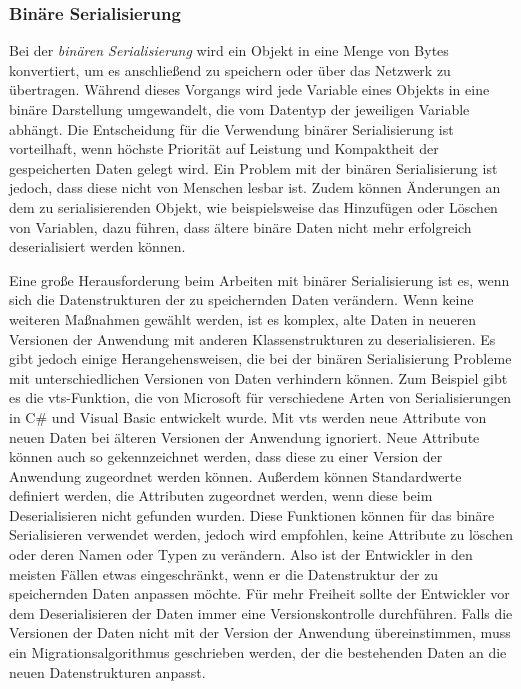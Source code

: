 \subsubsection{Binäre Serialisierung} \label{sssec:binSerialisierung}
Bei der \textit{binären Serialisierung} wird ein Objekt in eine Menge von Bytes konvertiert, um es anschließend zu speichern oder über das Netzwerk zu übertragen. Während dieses Vorgangs wird jede Variable eines Objekts in eine binäre Darstellung umgewandelt, die vom Datentyp der jeweiligen Variable abhängt. Die Entscheidung für die Verwendung binärer Serialisierung ist vorteilhaft, wenn höchste Priorität auf Leistung und Kompaktheit der gespeicherten Daten gelegt wird. Ein Problem mit der binären Serialisierung ist jedoch, dass diese nicht von Menschen lesbar ist. Zudem können Änderungen an dem zu serialisierenden Objekt, wie beispielsweise das Hinzufügen oder Löschen von Variablen, dazu führen, dass ältere binäre Daten nicht mehr erfolgreich deserialisiert werden können.\cite{microsoftBinarySerialization}\cite{programmathicallyUnderstandingBinary}

Eine große Herausforderung beim Arbeiten mit binärer Serialisierung ist es, wenn sich die Datenstrukturen der zu speichernden Daten verändern. Wenn keine weiteren Maßnahmen gewählt werden, ist es komplex, alte Daten in neueren Versionen der Anwendung mit anderen Klassenstrukturen zu deserialisieren. Es gibt jedoch einige Herangehensweisen, die bei der binären Serialisierung Probleme mit unterschiedlichen Versionen von Daten verhindern können. Zum Beispiel gibt es die \ac{vts}-Funktion, die von Microsoft für verschiedene Arten von Serialisierungen in C\# und Visual Basic entwickelt wurde.\cite{microsoftVersiontolerantBinary} Mit \ac{vts} werden neue Attribute von neuen Daten bei älteren Versionen der Anwendung ignoriert. Neue Attribute können auch so gekennzeichnet werden, dass diese zu einer Version der Anwendung zugeordnet werden können. Außerdem können Standardwerte definiert werden, die Attributen zugeordnet werden, wenn diese beim Deserialisieren nicht gefunden wurden. Diese Funktionen können für das binäre Serialisieren verwendet werden, jedoch wird empfohlen, keine Attribute zu löschen oder deren Namen oder Typen zu verändern.\cite{microsoftVersiontolerantBinary} Also ist der Entwickler in den meisten Fällen etwas eingeschränkt, wenn er die Datenstruktur der zu speichernden Daten anpassen möchte. Für mehr Freiheit sollte der Entwickler vor dem Deserialisieren der Daten immer eine Versionskontrolle durchführen. Falls die Versionen der Daten nicht mit der Version der Anwendung übereinstimmen, muss ein Migrationsalgorithmus geschrieben werden, der die bestehenden Daten an die neuen Datenstrukturen anpasst.

